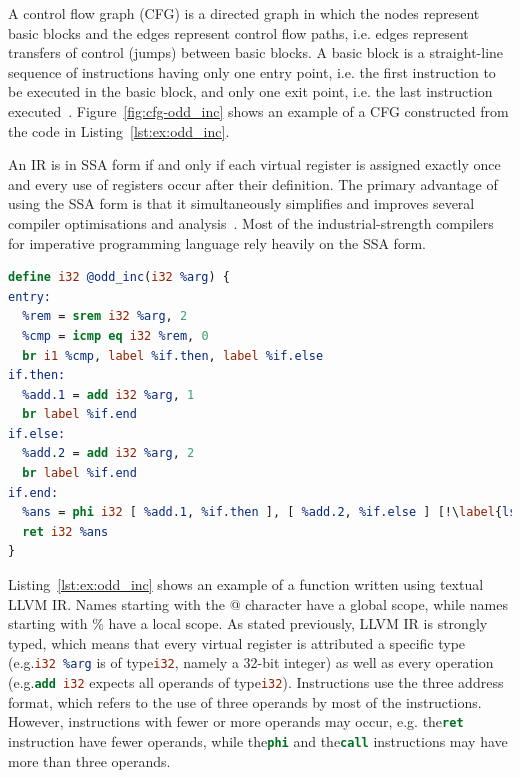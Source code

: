 A control flow graph (CFG) is a directed graph in which the nodes represent basic blocks and the edges represent control flow paths, i.e. edges represent transfers of control (jumps) between basic blocks.
A basic block is a straight-line sequence of instructions having only one entry point, i.e. the first instruction to be executed in the basic block, and only one exit point, i.e. the last instruction executed~\citep{allen70,cytron91}.
Figure~\ref{fig:cfg-odd_inc} shows an example of a CFG constructed from the code in Listing~\ref{lst:ex:odd_inc}.

An IR is in SSA form if and only if each virtual register is assigned exactly once and every use of registers occur after their definition.
The primary advantage of using the SSA form is that it simultaneously simplifies and improves several compiler optimisations and analysis~\citep{alpern88,cytron91}.
Most of the industrial-strength compilers for imperative programming language rely heavily on the SSA form.

\begin{lstlisting}[language=llvm,style=nasm,caption={An illustrative example of a function in textual LLVM IR. This function returns the argument incremented by one if it is even or by two if it is an odd integer.}, label={lst:ex:odd_inc}]
define i32 @odd_inc(i32 %arg) {
entry:
  %rem = srem i32 %arg, 2
  %cmp = icmp eq i32 %rem, 0
  br i1 %cmp, label %if.then, label %if.else
if.then:
  %add.1 = add i32 %arg, 1
  br label %if.end
if.else:
  %add.2 = add i32 %arg, 2
  br label %if.end
if.end:
  %ans = phi i32 [ %add.1, %if.then ], [ %add.2, %if.else ] [!\label{lst:odd_inc:phi}!]
  ret i32 %ans
}
\end{lstlisting}

Listing~\ref{lst:ex:odd_inc} shows an example of a function written using textual LLVM IR.
Names starting with the @ character have a global scope, while names starting with \% have a local scope.
As stated previously, LLVM IR is strongly typed, which means that every virtual register is attributed a specific type (e.g.\lstinline[language=llvm,style=nasm]{i32 %arg} is of type\lstinline[language=llvm,style=nasm]{i32}, namely a 32-bit integer) as well as every operation (e.g.\lstinline[language=llvm,style=nasm]{add i32} expects all operands of type\lstinline[language=llvm,style=nasm]{i32}).
Instructions use the three address format, which refers to the use of three operands by most of the instructions.
However, instructions with fewer or more operands may occur, e.g. the\lstinline[language=llvm,style=nasm]{ret} instruction have fewer operands, while the\lstinline[language=llvm,style=nasm]{phi} and the\lstinline[language=llvm,style=nasm]{call} instructions may have more than three operands.


